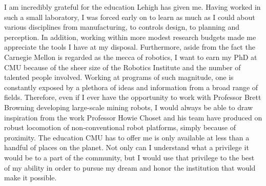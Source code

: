 \documentclass[12pt]{article}
\begin{document}
I am incredibly grateful for the education Lehigh has given me. Having worked
in such a small laboratory, I was forced early on to learn as much as I could
about various disciplines from manufacturing, to controls design, to planning
and perception. In addition, working within more modest research budgets made
me appreciate the tools I have at my disposal. Furthermore, aside from the fact
the Carnegie Mellon is regarded as the mecca of robotics, I want to earn my PhD
at CMU because of the sheer size of the Robotics Institute and the number of
talented people involved. Working at programs of such magnitude, one is
constantly exposed by a plethora of ideas and information from a broad range of
fields. Therefore, even if I ever have the opportunity to work with Professor
Brett Browning developing large-scale mining robots, I would always be able to
draw inspiration from the work Professor Howie Choset and his team have
produced on robust locomotion of non-conventional robot platforms, simply
because of proximity. The education CMU has to offer me is only available at
less than a handful of places on the planet. Not only can I understand what a
privilege it would be to a part of the community, but I would use that
privilege to the best of my ability in order to pursue my dream and honor the
institution that would make it possible.
\end{document}
